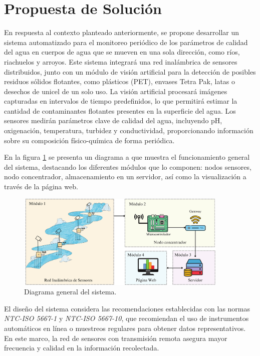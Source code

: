\section{Propuesta de Solución}

En respuesta al contexto planteado anteriormente, se propone desarrollar un sistema automatizado para el monitoreo periódico de los parámetros de calidad del agua en cuerpos de agua que se mueven en una sola dirección, como ríos, riachuelos y arroyos. Este sistema integrará una red inalámbrica de sensores distribuidos, junto con un módulo de visión artificial para la detección de posibles residuos sólidos flotantes, como plásticos (PET), envases Tetra Pak, latas o desechos de unicel de un solo uso. La visión artificial procesará imágenes capturadas en intervalos de tiempo predefinidos, lo que permitirá estimar la cantidad de contaminantes flotantes presentes en la superficie del agua. Los sensores medirán parámetros clave de calidad del agua, incluyendo pH, oxigenación, temperatura, turbidez y conductividad, proporcionando información sobre su composición físico-química de forma periódica.

En la figura \ref{Dig:diagrama general} se presenta un diagrama a que muestra el funcionamiento general del sistema, destacando los diferentes módulos que lo componen: nodos sensores, nodo concentrador, almacenamiento en un servidor, así como la visualización a través de la página web.

\begin{figure}[H]
    \centering
    \includegraphics[width=0.9\textwidth]{Documento/Imagenes/Propuesta Sol/Dig_gen.pdf}
    \caption{Diagrama general del sistema.}
    \label{Dig:diagrama general}
\end{figure}


El diseño del sistema  considera las recomendaciones establecidas con las normas \textit{NTC-ISO 5667-1} y \textit{NTC-ISO 5667-10}, que recomiendan el uso de instrumentos automáticos en línea o muestreos regulares para obtener datos representativos. En este marco, la red de sensores con transmisión remota asegura mayor frecuencia y calidad en la información recolectada.  

